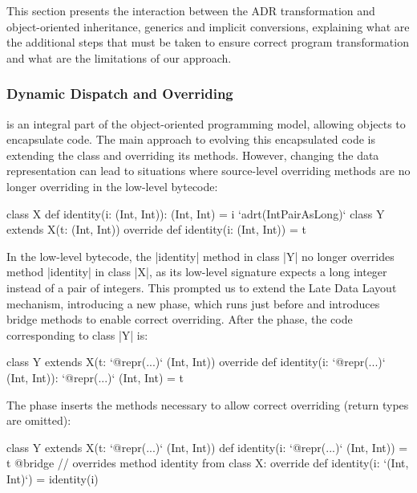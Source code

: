 This section presents the interaction between the ADR transformation and object-oriented inheritance, generics and implicit conversions, explaining what are the additional steps that must be taken to ensure correct program transformation and what are the limitations of our approach.

\subsubsection{Dynamic Dispatch and Overriding}
\label{sec:ildl:language-overriding}
is an integral part of the object-oriented programming model, allowing objects to encapsulate code. The main approach to evolving this encapsulated code is extending the class and overriding its methods. However, changing the data representation can lead to situations where source-level overriding methods are no longer overriding in the low-level bytecode:

\begin{lstlisting-nobreak}
class X {
  def identity(i: (Int, Int)): (Int, Int) = i
}
`adrt(IntPairAsLong)` {
  class Y extends X(t: (Int, Int)) {
    override def identity(i: (Int, Int)) = t
  }
}
\end{lstlisting-nobreak}

In the low-level bytecode, the |identity| method in class |Y| no longer overrides method |identity| in class |X|, as its low-level signature expects a long integer instead of a pair of integers. This prompted us to extend the Late Data Layout mechanism, introducing a new \bridge{} phase, which runs just before \coerce{} and introduces bridge methods to enable correct overriding. After the \inject{} phase, the code corresponding to class |Y| is:

\begin{lstlisting-nobreak}
class Y extends X(t: `@repr(...)` (Int, Int)) {
  override def identity(i: `@repr(...)` (Int, Int)): `@repr(...)` (Int, Int) = t
}
\end{lstlisting-nobreak}

The \bridge{} phase inserts the methods necessary to allow correct overriding (return types are omitted):

\begin{lstlisting-nobreak}
class Y extends X(t: `@repr(...)` (Int, Int)) {
  def identity(i: `@repr(...)` (Int, Int)) = t
  @bridge // overrides method identity from class X:
  override def identity(i: `(Int, Int)`) = identity(i)
}
\end{lstlisting-nobreak}


